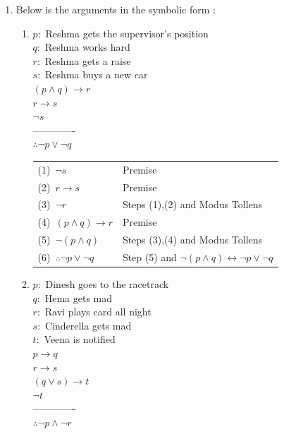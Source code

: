 \documentclass{article}
\begin{document}
\begin{enumerate}
\item Below is the arguments in the symbolic form :

\begin{enumerate}

\item $p:$ Reshma gets the supervisor’s position\\
$q:$ Reshma works hard \\ 
$r:$ Reshma gets a raise \\ 
$s:$ Reshma buys a new car\\

$(p \wedge q) \rightarrow r$\\
$r \rightarrow s$\\
$\lnot s$\\ 
-------------\\
$\therefore \lnot p \vee \lnot q$\\ 

\begin{center}
\begin{tabular}{ l l }
(1)~$\lnot s$ & Premise \\
(2)~$r \rightarrow s$ & Premise  \\ 
(3)~$\lnot r$ & Steps (1),(2) and Modus Tollens \\
(4)~$(p \wedge q) \rightarrow r$ &  Premise \\ 
(5)~$\lnot(p \wedge q)$ & Steps (3),(4) and Modus Tollens  \\
(6)~$\therefore  \lnot p \vee \lnot q$ & Step (5) and $\lnot (p \wedge q) \leftrightarrow \lnot p \vee \lnot q$    
\end{tabular}
\end{center}


\item $p:$ Dinesh goes to the racetrack\\
$q:$ Hema gets mad \\ 
$r:$ Ravi plays card all night \\ 
$s:$ Cinderella gets mad\\
$t:$ Veena is notified\\

$p \rightarrow q$\\
$r \rightarrow s$\\
$(q \vee s) \rightarrow t$\\ 
$\lnot t$\\ 	
-------------\\
$\therefore \lnot p \wedge \lnot r$\\


\end{enumerate}
\end{enumerate}
\end{document}
